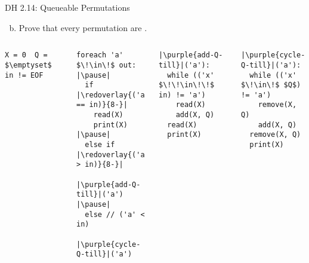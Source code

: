 \begin{frame}[fragile]{}
  \begin{exampleblock}{DH 2.14: Queueable Permutations}
    \begin{enumerate}[(a)]
      \setcounter{enumi}{1}
      \item Prove that every permutation are .
    \end{enumerate}
  \end{exampleblock}


  \begin{columns}
  \pause
  \begin{lstlisting}[style = Cstyle]
X = 0  Q = $\emptyset$  in != EOF
  \end{lstlisting}
      \begin{lstlisting}[style = Cstyle]
foreach 'a' $\!\in\!$ out: |\pause|
  if |\redoverlay{('a' == in)}{8-}|
    read(X)
    print(X) |\pause|
  else if |\redoverlay{('a' > in)}{8-}|
    |\purple{add-Q-till}|('a') |\pause|
  else // ('a' < in)
    |\purple{cycle-Q-till}|('a')
      \end{lstlisting}
      \pause
      \begin{lstlisting}[style = Cstyle]
|\purple{add-Q-till}|('a'):
  while (('x' $\!\!\in\!\!$ in) != 'a')
    read(X)
    add(X, Q)
  read(X)
  print(X)
      \end{lstlisting}
      \pause
      \begin{lstlisting}[style = Cstyle]
|\purple{cycle-Q-till}|('a'):
  while (('x' $\!\in\!$ $Q$) != 'a')
    remove(X, Q)
    add(X, Q)
  remove(X, Q)
  print(X)
      \end{lstlisting}
  \end{columns}
\end{frame}

